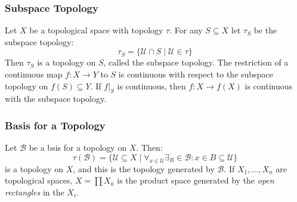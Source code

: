 \documentclass{article}                                                        %
\begin{document}
            \subsubsection{Subspace Topology}
                Let $X$ be a topological space with topology $\tau$. For any
                $S\subseteq{X}$ let $\tau_{S}$ be the subspace topology:
                \begin{equation}
                    \tau_{S}=\{\mathcal{U}\cap{S}\;|\;\mathcal{U}\in\tau\}
                \end{equation}
                Then $\tau_{S}$ is a topology on $S$, called the subspace
                topology. The restriction of a continuous map
                $f:X\rightarrow{Y}$ to $S$ is continuous with respect to the
                subspace topology on $f(S)\subseteq{Y}$. If $f|_{S}$ is
                continuous, then $f:X\rightarrow{f}(X)$ is continuous with the
                subspace topology.
            \subsubsection{Basis for a Topology}
                Let $\mathscr{B}$ be a bsis for a topology on $X$. Then:
                \begin{equation}
                    \tau(\mathscr{B})=\{\mathcal{U}\subseteq{X}\;|\;
                        \forall_{x\in\mathcal{U}}\exists_B\in\mathscr{B}:
                        x\in{B}\subseteq\mathcal{U}\}
                \end{equation}
                is a topology on $X$, and this is the topology generated by
                $\mathscr{B}$. If $X_{1},\dots,X_{n}$ are topological spaces,
                $X=\prod{X}_{k}$ is the product space generated by the
                \textit{open rectangles} in the $X_{i}$.
\end{document}

